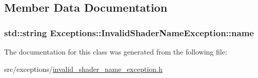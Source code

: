 \subsection{Member Data Documentation}
\hypertarget{class_exceptions_1_1_invalid_shader_name_exception_a3d9438219209a9bfe42df58f3107e3c8}{}
\subsubsection[{name}]{\setlength{\rightskip}{0pt plus 5cm}std\+::string Exceptions\+::\+Invalid\+Shader\+Name\+Exception\+::name\hspace{0.3cm}{\ttfamily [private]}}\label{class_exceptions_1_1_invalid_shader_name_exception_a3d9438219209a9bfe42df58f3107e3c8}


The documentation for this class was generated from the following file\+:\begin{DoxyCompactItemize}
\item 
src/exceptions/\hyperlink{invalid__shader__name__exception_8h}{invalid\+\_\+shader\+\_\+name\+\_\+exception.\+h}\end{DoxyCompactItemize}
